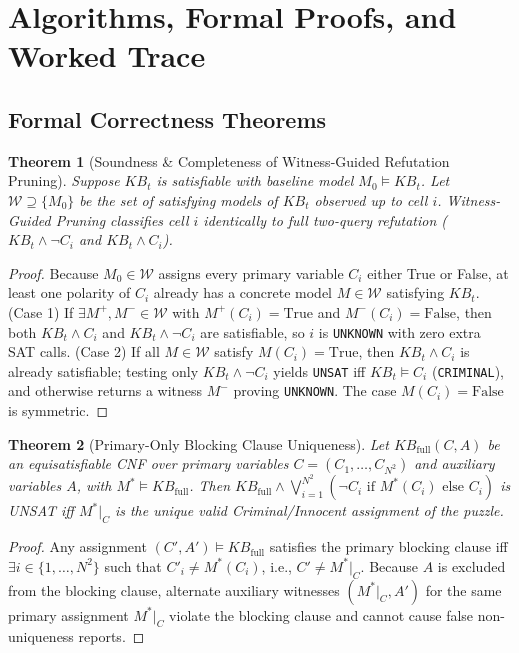 \documentclass[11pt,a4paper]{article}
\newtheorem{theorem}{Theorem}[section]
\begin{document}
\section{Algorithms, Formal Proofs, and Worked Trace}

\subsection{Formal Correctness Theorems}

\begin{theorem}[Soundness \& Completeness of Witness-Guided Refutation Pruning]
Suppose $KB_t$ is satisfiable with baseline model $M_0 \models KB_t$. Let $\mathcal{W} \supseteq \{M_0\}$ be the set of satisfying models of $KB_t$ observed up to cell $i$. Witness-Guided Pruning classifies cell $i$ identically to full two-query refutation ($KB_t \land \neg C_i$ and $KB_t \land C_i$).
\end{theorem}
\begin{proof}
Because $M_0 \in \mathcal{W}$ assigns every primary variable $C_i$ either True or False, at least one polarity of $C_i$ already has a concrete model $M \in \mathcal{W}$ satisfying $KB_t$. (Case 1) If $\exists M^+, M^- \in \mathcal{W}$ with $M^+(C_i)=\text{True}$ and $M^-(C_i)=\text{False}$, then both $KB_t \land C_i$ and $KB_t \land \neg C_i$ are satisfiable, so $i$ is \texttt{UNKNOWN} with zero extra SAT calls. (Case 2) If all $M \in \mathcal{W}$ satisfy $M(C_i) = \text{True}$, then $KB_t \land C_i$ is already satisfiable; testing only $KB_t \land \neg C_i$ yields \texttt{UNSAT} iff $KB_t \models C_i$ (\texttt{CRIMINAL}), and otherwise returns a witness $M^-$ proving \texttt{UNKNOWN}. The case $M(C_i) = \text{False}$ is symmetric.
\end{proof}

\begin{theorem}[Primary-Only Blocking Clause Uniqueness]
Let $KB_{\text{full}}(C, A)$ be an equisatisfiable CNF over primary variables $C = (C_1, \dots, C_{N^2})$ and auxiliary variables $A$, with $M^* \models KB_{\text{full}}$. Then $KB_{\text{full}} \land \bigvee_{i=1}^{N^2} (\neg C_i \text{ if } M^*(C_i) \text{ else } C_i)$ is UNSAT iff $M^*|_C$ is the unique valid Criminal/Innocent assignment of the puzzle.
\end{theorem}
\begin{proof}
Any assignment $(C', A') \models KB_{\text{full}}$ satisfies the primary blocking clause iff $\exists i \in \{1,\dots,N^2\}$ such that $C'_i \neq M^*(C_i)$, i.e., $C' \neq M^*|_C$. Because $A$ is excluded from the blocking clause, alternate auxiliary witnesses $(M^*|_C, A')$ for the same primary assignment $M^*|_C$ violate the blocking clause and cannot cause false non-uniqueness reports.
\end{proof}
\end{document}

